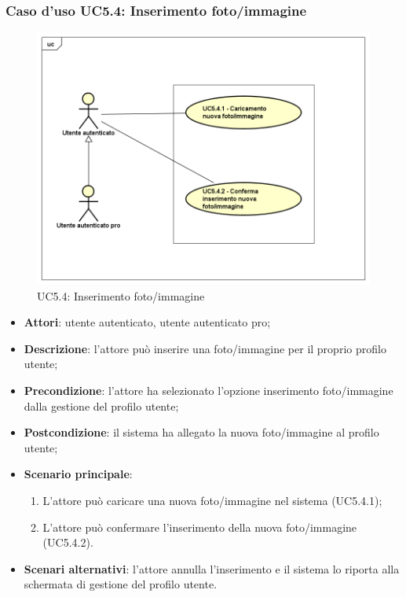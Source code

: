 \subsubsection{Caso d'uso UC5.4: Inserimento foto/immagine}
\label{UC5.4}
\begin{figure}[h]
	\centering
	\includegraphics[scale=0.5,keepaspectratio]{UML/UC5_4.png}
	\caption{UC5.4: Inserimento foto/immagine}
\end{figure}
\begin{itemize}
	\item \textbf{Attori}: utente autenticato, utente autenticato pro;
	\item \textbf{Descrizione}: l'attore può inserire una foto/immagine per il proprio profilo utente;
	\item \textbf{Precondizione}: l'attore ha selezionato l'opzione inserimento foto/immagine dalla gestione del profilo utente; 
	\item \textbf{Postcondizione}: il sistema ha allegato la nuova foto/immagine al profilo utente;
	\item \textbf{Scenario principale}:
	\begin{enumerate}
		\item L'attore può caricare una nuova foto/immagine nel sistema (UC5.4.1);
		\item L'attore può confermare l'inserimento della nuova foto/immagine (UC5.4.2).
	\end{enumerate}
	\item \textbf{Scenari alternativi}: l'attore annulla l'inserimento e il sistema lo riporta alla schermata di gestione del profilo utente.
\end{itemize}

